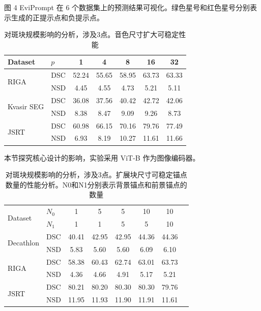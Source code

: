\documentclass[12pt,a4paper]{article}
\begin{document}
	图 4 EviPrompt 在 6 个数据集上的预测结果可视化。绿色星号和红色星号分别表示生成的正提示点和负提示点。
	\begin{table}[htbp]
		\centering
		\setlength{\tabcolsep}{8pt} %
		\begin{tabular}{l l c c c c c}
			\hline
			Dataset & $p$ & 1 & 4 & 8 & 16 & 32 \\
			\hline
			\multirow{2}{*}{RIGA} & DSC & 52.24 & 55.65 & 58.95 & 63.73 & 63.33 \\
			& NSD & 4.45 & 4.55 & 4.73 & 5.21 & 5.11 \\
			\hline
			\multirow{2}{*}{Kvasir SEG} & DSC & 36.08 & 37.56 & 40.42 & 42.72 & 42.06 \\
			& NSD & 8.38 & 8.47 & 9.09 & 9.26 & 8.73 \\
			\hline
			\multirow{2}{*}{JSRT} & DSC & 60.98 & 66.15 & 70.16 & 79.76 & 77.49 \\
			& NSD & 6.93 & 8.19 & 10.27 & 11.61 & 11.66 \\
			\hline
		\end{tabular}
		\caption{对斑块规模影响的分析，涉及3点。音色尺寸扩大可稳定性能}
		\label{tab:3}
	\end{table}
	本节探究核心设计的影响，实验采用 ViT-B 作为图像编码器。
	\begin{table}[htbp]
		\centering
		\setlength{\tabcolsep}{8pt} %
		\begin{tabular}{l l c c c c c c}
			\hline
			\multirow{2}{*}{Dataset}  & $N_0$ & 1 & 5 & 5 & 10 & 10 \\
			& $N_1$ & 1 & 1 & 5 & 5 & 10 \\
			\hline
			\multirow{2}{*}{Decathlon} & DSC & 40.41 & 42.95 & 42.95 & 44.36 & 44.36 \\
			& NSD & 5.83 & 5.60 & 5.60 & 6.09 & 6.10 \\
			\hline
			\multirow{2}{*}{RIGA} & DSC & 58.38 & 60.43 & 62.74 & 63.01 & 63.73 \\
			& NSD & 4.36 & 4.66 & 4.91 & 5.17 & 5.21 \\
			\hline
			\multirow{2}{*}{JSRT} & DSC & 80.21 & 80.20 & 80.30 & 80.30 & 79.76 \\
			& NSD & 11.95 & 11.93 & 11.90 & 11.91 & 11.61 \\
			\hline
		\end{tabular}
		\caption{对斑块规模影响的分析，涉及3点。扩展块尺寸可稳定锚点数量的性能分析。N0和N1分别表示背景锚点和前景锚点的数量}
		\label{tab:3}
	\end{table}
\end{document}

